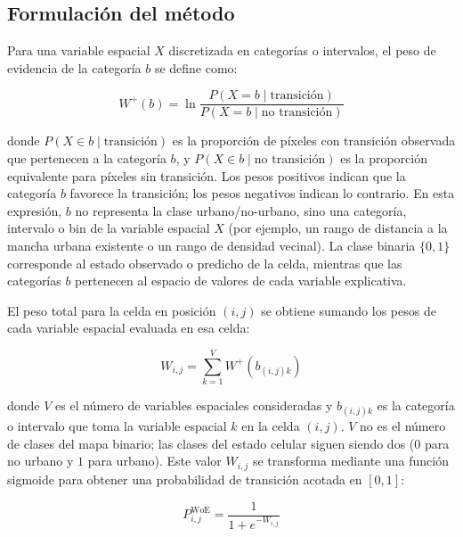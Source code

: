 \subsection{Formulación del método}

Para una variable espacial $X$ discretizada en categorías o intervalos, el peso de evidencia de la categoría $b$ se define como:

\begin{equation}
W^+(b) = \ln \frac{P(X = b \mid \text{transición})}{P(X = b \mid \text{no transición})}
\label{eq:woe}
\end{equation}

donde $P(X \in b \mid \text{transición})$ es la proporción de píxeles con transición observada que pertenecen a la categoría $b$, y $P(X \in b \mid \text{no transición})$ es la proporción equivalente para píxeles sin transición. Los pesos positivos indican que la categoría $b$ favorece la transición; los pesos negativos indican lo contrario. En esta expresión, $b$ no representa la clase urbano/no-urbano, sino una categoría, intervalo o bin de la variable espacial $X$ (por ejemplo, un rango de distancia a la mancha urbana existente o un rango de densidad vecinal). La clase binaria $\{0,1\}$ corresponde al estado observado o predicho de la celda, mientras que las categorías $b$ pertenecen al espacio de valores de cada variable explicativa.

El peso total para la celda en posición $(i,j)$ se obtiene sumando los pesos de cada variable espacial evaluada en esa celda:

\begin{equation}
W_{i,j} = \sum_{k=1}^{V} W^+(b_{(i,j)k})
\label{eq:woe_total}
\end{equation}

donde $V$ es el número de variables espaciales consideradas y $b_{(i,j)k}$ es la categoría o intervalo que toma la variable espacial $k$ en la celda $(i,j)$. $V$ no es el número de clases del mapa binario; las clases del estado celular siguen siendo dos ($0$ para no urbano y $1$ para urbano). Este valor $W_{i,j}$ se transforma mediante una función sigmoide para obtener una probabilidad de transición acotada en $[0,1]$:

\begin{equation}
P_{i,j}^{\text{WoE}} = \frac{1}{1 + e^{-W_{i,j}}}
\label{eq:woe_sigmoid}
\end{equation}


